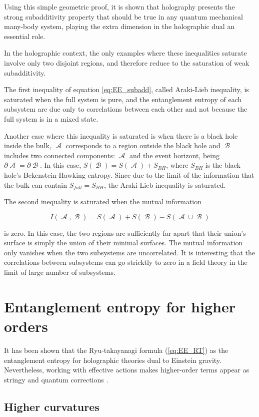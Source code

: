 \documentclass[lettersize,journal]{IEEEtran}
\providecommand{\eq}[2]{
    \begin{equation}
        #2
    \label{eq:#1}
    \end{equation}
}
\DeclareMathOperator{\calA}{\mathcal{A}}
\DeclareMathOperator{\calB}{\mathcal{B}}
\begin{document}
Using this simple geometric proof, it is shown that holography presents the strong subadditivity property that should be true in any quantum mechanical many-body system, playing the extra dimension in the holographic dual an essential role.

In the holographic context, the only examples where these inequalities saturate involve only two disjoint regions, and therefore reduce to the saturation of weak subadditivity.

The first inequality of equation \ref{eq:EE_subadd}, called Araki-Lieb inequality, is saturated when the full system is pure, and the entanglement entropy of each subsystem are due only to correlations between each other and not because the full system is in a mixed state.

Another case where this inequality is saturated is when there is a black hole inside the bulk, $\calA$ corresponds to a region outside the black hole and $\calB$ includes two connected components: $\calA$ and the event horizont, being $\partial \calA = \partial \calB$. In this case, $S(\calB) = S(\calA) + S_{BH}$, where $S_{BH}$ is the black hole's Bekenstein-Hawking entropy. Since due to the limit of the information that the bulk can contain $S_{full} = S_{BH}$, the Araki-Lieb inequality is saturated.

The second inequality is saturated when the mutual information
\eq{Mutual-Info}{
    I(\calA,\calB) = S(\calA) + S(\calB) - S(\calA \cup \calB)
}
is zero. In this case, the two regions are sufficiently far apart that their union's surface is simply the union of their minimal surfaces. The mutual information only vanishes when the two subsystems are uncorrelated. It is interesting that the correlations between subsystems can go stricktly to zero in a field theory in the limit of large number of subsystems.


\section{Entanglement entropy for higher orders} \label{s:EE_HO}

It has been shown that the Ryu-takayanagi formula (\ref{eq:EE_RT}) as the entanglement entropy for holographic theories dual to Einstein gravity. Nevertheless, working with effective actions makes higher-order terms appear as stringy and quantum corrections \cite{bueno_holographic_2021}.


\subsection{Higher curvatures} \label{ss:StringyC}
\end{document}
